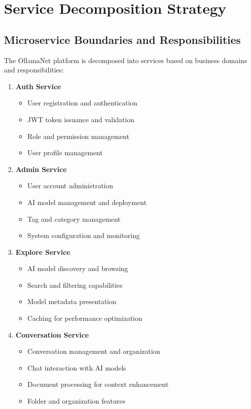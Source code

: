 \section{Service Decomposition Strategy}

\subsection{Microservice Boundaries and Responsibilities}

The OllamaNet platform is decomposed into services based on business domains and responsibilities:

\begin{enumerate}
   \item \textbf{Auth Service}
   \begin{itemize}
      \item User registration and authentication
      \item JWT token issuance and validation
      \item Role and permission management
      \item User profile management
   \end{itemize}

   \item \textbf{Admin Service}
   \begin{itemize}
      \item User account administration
      \item AI model management and deployment
      \item Tag and category management
      \item System configuration and monitoring
   \end{itemize}

   \item \textbf{Explore Service}
   \begin{itemize}
      \item AI model discovery and browsing
      \item Search and filtering capabilities
      \item Model metadata presentation
      \item Caching for performance optimization
   \end{itemize}

   \item \textbf{Conversation Service}
   \begin{itemize}
      \item Conversation management and organization
      \item Chat interaction with AI models
      \item Document processing for context enhancement
      \item Folder and organization features
   \end{itemize}


\end{enumerate}
